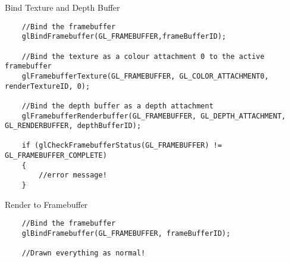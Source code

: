 \begin{frame}[fragile]{Bind Texture and Depth Buffer}
	\begin{lstlisting}
	//Bind the framebuffer
	glBindFramebuffer(GL_FRAMEBUFFER,frameBufferID);
	
	//Bind the texture as a colour attachment 0 to the active framebuffer
	glFramebufferTexture(GL_FRAMEBUFFER, GL_COLOR_ATTACHMENT0, renderTextureID, 0);
	
	//Bind the depth buffer as a depth attachment
	glFramebufferRenderbuffer(GL_FRAMEBUFFER, GL_DEPTH_ATTACHMENT, GL_RENDERBUFFER, depthBufferID);
	
	if (glCheckFramebufferStatus(GL_FRAMEBUFFER) != GL_FRAMEBUFFER_COMPLETE)
	{
		//error message!
	}
	\end{lstlisting}
\end{frame}


\begin{frame}[fragile]{Render to Framebuffer}
	\begin{lstlisting}
	//Bind the framebuffer
	glBindFramebuffer(GL_FRAMEBUFFER, frameBufferID);
	
	//Drawn everything as normal!
	\end{lstlisting}
\end{frame}
